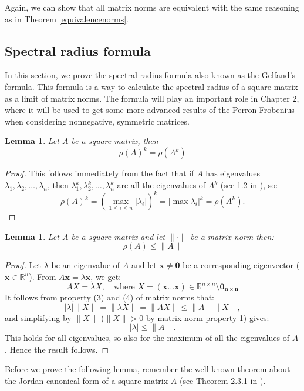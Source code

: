 \documentclass[a4paper,11pt]{report}
\newtheorem{lemma}[theorem]{Lemma}
\newcommand{\R}{{\mathbb R}}
\begin{document}
Again, we can show that all matrix norms are equivalent with the same reasoning 
as in Theorem \ref{equivalencenorms}.

\subsection{Spectral radius formula}
In this section, we prove the spectral radius formula also known as the Gelfand's 
formula. This formula is a way to calculate the spectral radius of a
square matrix as a limit of matrix norms. The formula will play an important 
role in Chapter 2, where it will be used to get some more advanced results of the 
Perron-Frobenius when considering nonnegative, symmetric matrices.
\begin{lemma}
Let $A$ be a square matrix, then
$$\rho(A)^k = \rho(A^k)$$
\end{lemma}
\begin{proof}
  This follows immediately from the fact that if $A$ has eigenvalues
  $\lambda_1, \lambda_2,\ldots, \lambda_n$, then $\lambda_1^k, \lambda_2^k, \ldots, \lambda_n^k$
  are all the eigenvalues of $A^k$ (see 1.2 in \cite{kieboom}), so:
  $$\rho(A)^k = \left(\max_{1 \leq i \leq n} |\lambda_i|\right)^k = 
  |\max \lambda_i|^k = \rho(A^k).$$
\end{proof}
\begin{lemma}\label{ongelijkheidnorm}
  Let $A$ be a square matrix and let $\|\cdot\|$ be a matrix norm then:
  $$\rho(A) \leq \|A\|$$
\end{lemma}
\begin{proof}
  Let $\lambda$ be an eigenvalue of $A$ and let $\mathbf{x}\not = \mathbf{0}$ be a 
  corresponding eigenvector ($\mathbf{x}\in\R^n$). From $A\mathbf{x} = \lambda\mathbf{x}$, we get:
  $$AX = \lambda X, \quad \text{where } X = (\mathbf{x} \ldots \mathbf{x}) \in 
  \R^{n\times n}\setminus{\mathbf{0_{n\times n}}}$$
It follows from property (3) and (4) of matrix norms that:
$$|\lambda|\|X\| = \|\lambda X \| = \|A X\| \leq \|A\|\|X\|,$$
and simplifying by $\|X\|$ ($\|X\| > 0$ by matrix norm property 1) gives:
$$|\lambda| \leq \|A\|.$$
This holds for all eigenvalues, so also for the maximum of all the eigenvalues of $A$. Hence the result follows. 
\end{proof}
Before we prove the following lemma, remember the well known theorem about the 
Jordan canonical form of a square matrix $A$ (see Theorem 2.3.1 in \cite{kieboom}). 
\end{document}
